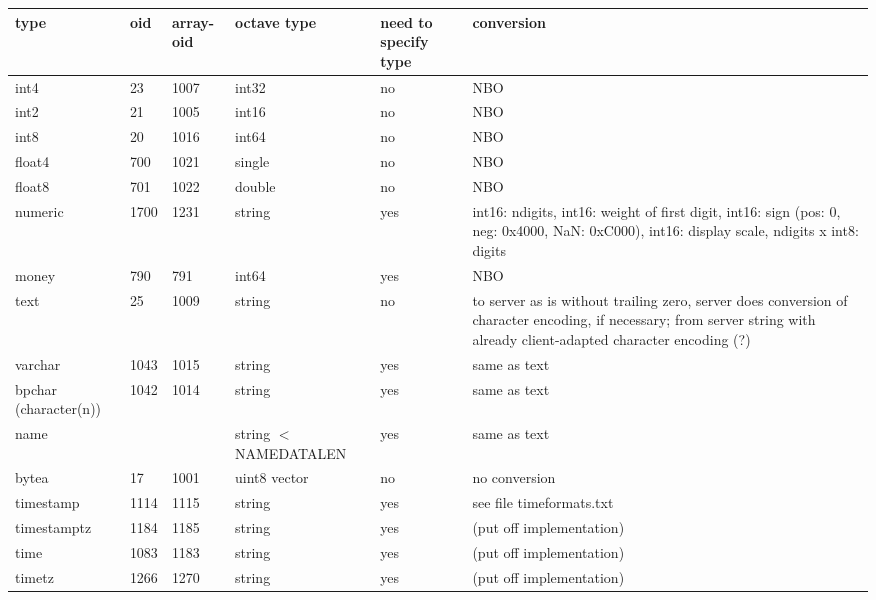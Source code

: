 \documentclass[a4paper,landscape]{article}
\begin{document}
\begin{longtable}{lp{40mm}p{40mm}p{50mm}p{40mm}p{50mm}}
type &
oid &
array-oid &
octave type &
need to specify type &
conversion \\\hline

int4 &
23 &
1007 &
int32 &
no &
NBO \\

int2 &
21 &
1005 &
int16 &
no &
NBO \\

int8 &
20 &
1016 &
int64 &
no &
NBO \\

float4 &
700 &
1021 &
single &
no &
NBO \\

float8 &
701 &
1022 &
double &
no &
NBO \\

numeric &
1700 &
1231 &
string &
yes &
int16: ndigits, int16: weight of first digit, int16: sign (pos: 0,
neg: 0x4000, NaN: 0xC000), int16: display scale, ndigits x int8:
digits \\

money &
790 &
791 &
int64 &
yes &
NBO \\

text &
25 &
1009 &
string &
no &
to server as is without trailing zero, server does conversion of
character encoding, if necessary; from server string with already
client-adapted character encoding (?) \\

varchar &
1043 &
1015 &
string &
yes &
same as text \\

bpchar (character(n)) &
1042 &
1014 &
string &
yes &
same as text \\

name &
&
&
string $<$ NAMEDATALEN &
yes &
same as text \\

bytea &
17 &
1001 &
uint8 vector &
no &
no conversion \\

timestamp &
1114 &
1115 &
string &
yes &
see file timeformats.txt \\

timestamptz &
1184 &
1185 &
string &
yes &
(put off implementation) \\

time &
1083 &
1183 &
string &
yes &
(put off implementation) \\

timetz &
1266 &
1270 &
string &
yes &
(put off implementation) \\


\end{longtable}
\end{document}
